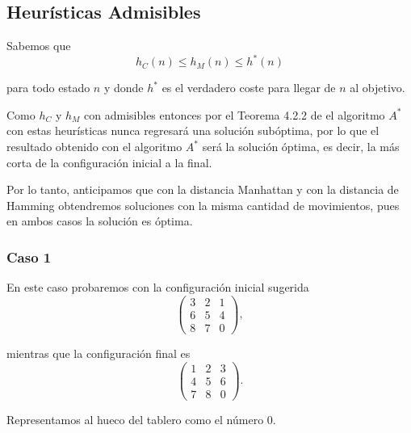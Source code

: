\documentclass[11pt]{article}
\begin{document}
    \hypertarget{heuruxedsticas-admisibles}{%
\subsection{Heurísticas Admisibles}\label{heuruxedsticas-admisibles}}

    Sabemos que \begin{equation}
        \label{admissible}
h_C(n)\leq h_M(n)\leq h^*(n)
\end{equation}

    para todo estado \(n\) y donde \(h^*\) es el verdadero coste para llegar
de \(n\) al objetivo.

    Como \(h_C\) y \(h_M\) con admisibles entonces por el Teorema 4.2.2 de 
\cite{ginsberg}  el algoritmo \(A^*\) con estas heurísticas nunca regresará
una solución subóptima, por lo que el resultado obtenido con el
algoritmo \(A^*\) será la solución óptima, es decir, la más corta de la
configuración inicial a la final.

    Por lo tanto, anticipamos que con la distancia Manhattan y con la
distancia de Hamming obtendremos soluciones con la misma cantidad de
movimientos, pues en ambos casos la solución es óptima.

    \hypertarget{caso-1}{%
\subsubsection{Caso 1}\label{caso-1}}

    En este caso probaremos con la configuración inicial sugerida
\begin{equation*}\begin{pmatrix}3&2&1\\ 6&5&4\\ 8&7&0 \end{pmatrix},\end{equation*}

    mientras que la configuración final es
\begin{equation*}\begin{pmatrix}1&2&3\\ 4&5&6\\ 7&8&0 \end{pmatrix}.\end{equation*}

    Representamos al hueco del tablero como el número \(0\).
\end{document}
